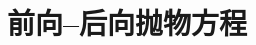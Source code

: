 \documentclass[../main.tex]{subfiles}
\begin{document}
\chapter{前向--后向抛物方程}\label{chapter:ch08}






\end{document}
